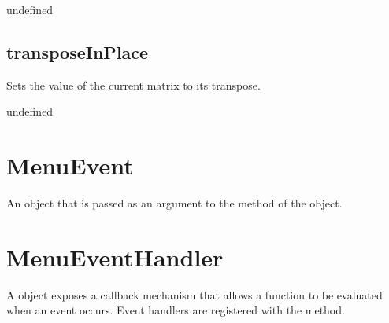 \documentclass[letterpaper,12pt,english,openany,oneside]{sphinxmanual}
\begin{document}
\label{\detokenize{JS_3D_API:syntax-63}}

\begin{sphinxVerbatim}[commandchars=\\\{\}]
\end{sphinxVerbatim}
\label{\detokenize{JS_3D_API:parameters-49}}

\label{\detokenize{JS_3D_API:section-68}}\label{\detokenize{JS_3D_API:returns-64}}

undefined


\subsection{transposeInPlace}
\label{\detokenize{JS_3D_API:transposeinplace}}
Sets the value of the current matrix to its transpose.

\label{\detokenize{JS_3D_API:syntax-64}}

\begin{sphinxVerbatim}[commandchars=\\\{\}]
\end{sphinxVerbatim}
\label{\detokenize{JS_3D_API:returns-65}}

undefined


\section{MenuEvent}
\label{\detokenize{JS_3D_API:menuevent}}
An object that is passed as an argument to the  method of the  object.

\label{\detokenize{JS_3D_API:properties-16}}


\section{MenuEventHandler}
\label{\detokenize{JS_3D_API:menueventhandler}}
A  object exposes a callback mechanism that allows a function to be evaluated when an event occurs. Event handlers are registered with the   method.
\end{document}
